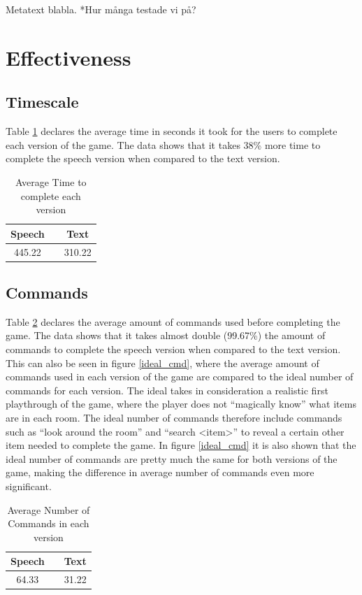 Metatext blabla.
*Hur många testade vi på?

\section{Effectiveness}

\subsection{Timescale} %
Table \ref{avg_time} declares the average time in seconds it took for the users to complete each version of the game. The data shows that it takes 38\% more time to complete the speech version when compared to the text version.

\begin{table}[h!]
  \centering
  \begin{tabular}{ccc}
    \toprule
    Speech &   & Text\\
    \midrule
    445.22 &   & 310.22\\
    \bottomrule
  \end{tabular}
  \caption{Average Time to complete each version}\label{avg_time}
\end{table}

\subsection{Commands} %
Table \ref{avg_cmd} declares the average amount of commands used before completing the game. The data shows that it takes almost double (99.67\%) the amount of commands to complete the speech version when compared to the text version. This can also be seen in figure \ref{ideal_cmd}, where the average amount of commands used in each version of the game are compared to the ideal number of commands for each version. The ideal takes in consideration a realistic first playthrough of the game, where the player does not ``magically know'' what items are in each room. The ideal number of commands therefore include commands such as ``look around the room'' and ``search <item>'' to reveal a certain other item needed to complete the game. In figure \ref{ideal_cmd} it is also shown that the ideal number of commands are pretty much the same for both versions of the game, making the difference in average number of commands even more significant.

\begin{table}[h!]
  \centering
  \begin{tabular}{ccc}
    \toprule
    Speech &   & Text\\
    \midrule
    64.33 &   & 31.22\\
    \bottomrule
  \end{tabular}
  \caption{Average Number of Commands in each version}\label{avg_cmd} %
\end{table}

